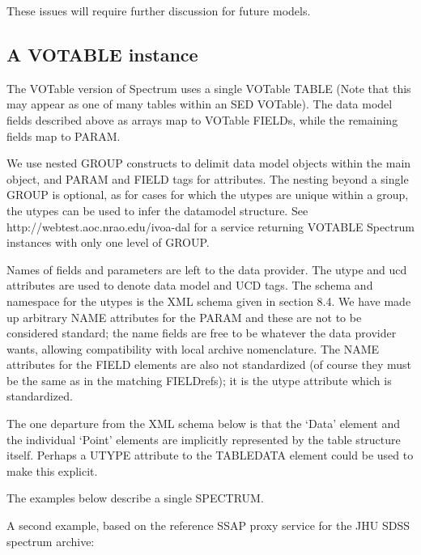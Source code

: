 These issues will require further discussion for future models.

\subsection{A VOTABLE instance}

The VOTable version of Spectrum uses a single VOTable {\lcaret}TABLE{\rcaret}
(Note that this may appear as one of many tables within an SED VOTable).
The data model fields described above as arrays map to
VOTable FIELDs, while the remaining fields map to PARAM.

We use nested GROUP constructs to delimit data model objects within the
main object, and PARAM and FIELD tags for attributes.
The nesting beyond a single GROUP is optional, as for cases for which
the utypes are unique within a group, the utypes can be used to infer
the datamodel structure. See
http://webtest.aoc.nrao.edu/ivoa-dal for a service returning VOTABLE
Spectrum instances with only one level of GROUP.

Names of fields and parameters are left to the data provider.
The utype and ucd attributes are used to denote data model and UCD tags.
The schema and namespace for the utypes is the XML schema given in section 8.4.
We have made up arbitrary NAME attributes for the PARAM and these
are not to be considered standard; the name fields are free
to be whatever the data provider wants, allowing compatibility with
local archive nomenclature. The NAME attributes for the FIELD elements
are also not standardized (of course they must be the same as in the
matching FIELDrefs); it is the utype attribute which is standardized.

The one departure from the XML schema below is that the `Data'
element and the individual `Point' elements are implicitly represented
by the table structure itself. Perhaps a UTYPE attribute to the
TABLEDATA element could be used to make this explicit.

The examples below describe a single SPECTRUM.



A second example, based on the reference SSAP proxy service for
the JHU SDSS spectrum archive:


